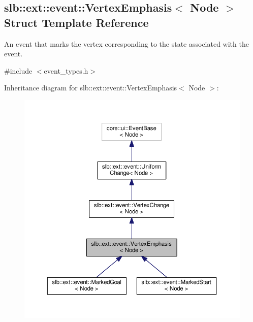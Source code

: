 \hypertarget{structslb_1_1ext_1_1event_1_1VertexEmphasis}{}\subsection{slb\+:\+:ext\+:\+:event\+:\+:Vertex\+Emphasis$<$ Node $>$ Struct Template Reference}
\label{structslb_1_1ext_1_1event_1_1VertexEmphasis}


An event that marks the vertex corresponding to the state associated with the event.  




{\ttfamily \#include $<$event\+\_\+types.\+h$>$}



Inheritance diagram for slb\+:\+:ext\+:\+:event\+:\+:Vertex\+Emphasis$<$ Node $>$\+:\nopagebreak
\begin{figure}[H]
\begin{center}
\leavevmode
\includegraphics[width=350pt]{structslb_1_1ext_1_1event_1_1VertexEmphasis__inherit__graph}
\end{center}
\end{figure}


